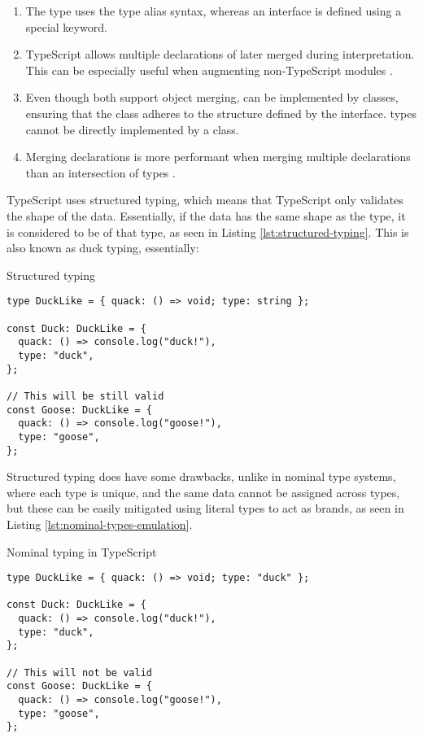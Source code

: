 \begin{enumerate}
  \item The  type uses the type alias syntax, whereas an interface is defined using a special  keyword.
  \item TypeScript allows multiple declarations of  later merged during interpretation. This can be especially useful when augmenting non-TypeScript modules \cite{DocumentationDeclarationMerging}. 
  \item Even though both support object merging,  can be implemented by classes, ensuring that the class adheres to the structure defined by the interface.  types cannot be directly implemented by a class.
  \item Merging  declarations is more performant when merging multiple declarations than an intersection of  types \cite{Performance}.
\end{enumerate}

TypeScript uses structured typing, which means that TypeScript only validates the shape of the data. Essentially, if the data has the same shape as the type, it is considered to be of that type, as seen in Listing \ref{lst:structured-typing}. This is also known as duck typing, essentially: 

\begin{listing}[ht]
  \caption{Structured typing}\label{lst:structured-typing}
  \begin{verbatim}
type DuckLike = { quack: () => void; type: string };

const Duck: DuckLike = {
  quack: () => console.log("duck!"),
  type: "duck",
};

// This will be still valid
const Goose: DuckLike = {
  quack: () => console.log("goose!"),
  type: "goose",
};
\end{verbatim}
\end{listing}

Structured typing does have some drawbacks, unlike in nominal type systems, where each type is unique, and the same data cannot be assigned across types, but these can be easily mitigated using literal types to act as brands, as seen in Listing \ref{lst:nominal-types-emulation}.

\begin{listing}[ht]
  \caption{Nominal typing in TypeScript}\label{lst:nominal-types-emulation}
  \begin{verbatim}
type DuckLike = { quack: () => void; type: "duck" };

const Duck: DuckLike = {
  quack: () => console.log("duck!"),
  type: "duck",
};

// This will not be valid
const Goose: DuckLike = {
  quack: () => console.log("goose!"),
  type: "goose",
};
\end{verbatim}
\end{listing}

